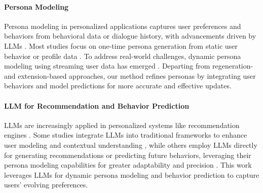 \paragraph{Persona Modeling} 
Persona modeling in personalized applications captures user preferences and behaviors from behavioral data or dialogue history, with advancements driven by LLMs \cite{li2021survey, tan2023user, tseng2024two}. Most studies focus on one-time persona generation from static user behavior or profile data \cite{ji2023chatgpt, wang2023zero, zhou2024language, wu2024rlpf, wang2024incharacter, xu2024character, lyu2023llm, salemi2023lamp}. To address real-world challenges, dynamic persona modeling using streaming user data has emerged \cite{lian2022incremental, wang2020incremental, yin2023heterogeneous, qin2024enhancing}. Departing from regeneration- and extension-based approaches, our method refines personas by integrating user behaviors and model predictions for more accurate and effective updates.

\paragraph{LLM for Recommendation and Behavior Prediction}
LLMs are increasingly applied in personalized systems like recommendation engines \cite{wang2023recmind,wu_surveylargelanguagemodels_2024,zhang2023recommendation}. Some studies integrate LLMs into traditional frameworks to enhance user modeling and contextual understanding \cite{liu2024once,zhang2024generative,li2023ctrl, li2023exploring}, while others employ LLMs directly for generating recommendations or predicting future behaviors, leveraging their persona modeling capabilities for greater adaptability and precision \cite{liu2023chatgpt, lyu2023llm, gao2023chat,dai2023uncovering}. This work leverages LLMs for dynamic persona modeling and behavior prediction to capture users’ evolving preferences.

